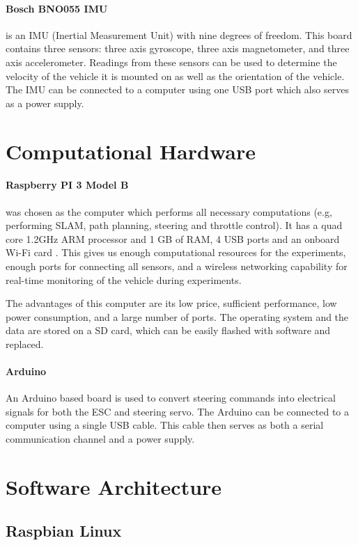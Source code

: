 \paragraph{Bosch BNO055 IMU} is an IMU (Inertial Measurement Unit) with nine degrees of freedom. This board contains three sensors: three axis gyroscope, three axis magnetometer, and three axis accelerometer. Readings from these sensors can be used to determine the velocity of the vehicle it is mounted on as well as the orientation of the vehicle. The IMU can be connected to a computer using one USB port which also serves as a power supply.

\section{Computational Hardware}

\paragraph{Raspberry PI 3 Model B} was chosen as the computer which performs all necessary computations (e.g, performing SLAM, path planning, steering and throttle control). It has a quad core 1.2GHz ARM processor and 1 GB of RAM, 4 USB ports and an onboard Wi-Fi card \cite{raspberry}. This gives us enough computational resources for the experiments, enough ports for connecting all sensors, and a wireless networking capability for real-time monitoring of the vehicle during experiments.

The advantages of this computer are its low price, sufficient performance, low power consumption, and a large number of ports. The operating system and the data are stored on a SD card, which can be easily flashed with software and replaced.

\paragraph{Arduino} An Arduino \cite{arduino} based board is used to convert steering commands into electrical signals for both the ESC and steering servo. The Arduino can be connected to a computer using a single USB cable. This cable then serves as both a serial communication channel and a power supply.

\section{Software Architecture}

\subsection{Raspbian Linux}

